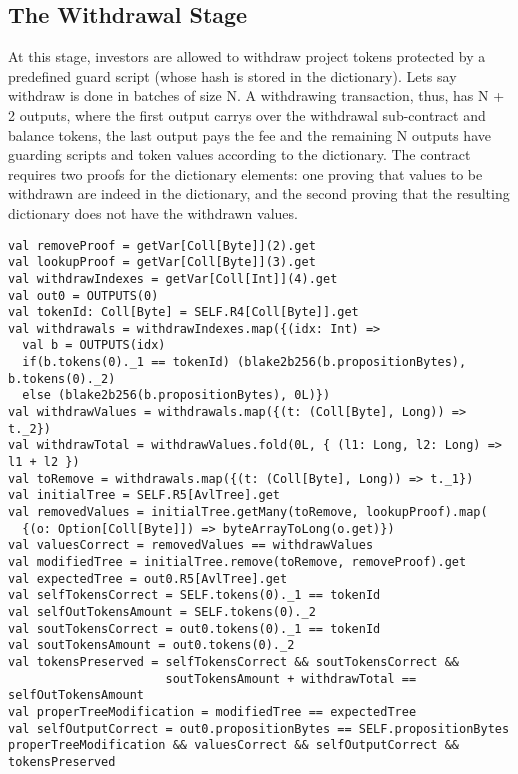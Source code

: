 \documentclass[11pt]{article}
\begin{document}
\subsection{The Withdrawal Stage}

At this stage, investors are allowed to withdraw project tokens protected by a predefined guard script (whose hash is stored in the dictionary). Lets say withdraw is done in batches of size N. A withdrawing transaction, thus, has N + 2 outputs, where the first output carrys over the withdrawal sub-contract and balance tokens, the last output pays the fee and the remaining N outputs have guarding scripts and token values according to the dictionary. The contract requires two proofs for the dictionary elements: one proving that values to be withdrawn are indeed in the dictionary, and the second proving that the resulting dictionary does not have the withdrawn values. 

\begin{verbatim}
val removeProof = getVar[Coll[Byte]](2).get
val lookupProof = getVar[Coll[Byte]](3).get
val withdrawIndexes = getVar[Coll[Int]](4).get
val out0 = OUTPUTS(0)
val tokenId: Coll[Byte] = SELF.R4[Coll[Byte]].get
val withdrawals = withdrawIndexes.map({(idx: Int) =>
  val b = OUTPUTS(idx)
  if(b.tokens(0)._1 == tokenId) (blake2b256(b.propositionBytes), b.tokens(0)._2)
  else (blake2b256(b.propositionBytes), 0L)})
val withdrawValues = withdrawals.map({(t: (Coll[Byte], Long)) => t._2})
val withdrawTotal = withdrawValues.fold(0L, { (l1: Long, l2: Long) => l1 + l2 })
val toRemove = withdrawals.map({(t: (Coll[Byte], Long)) => t._1})
val initialTree = SELF.R5[AvlTree].get
val removedValues = initialTree.getMany(toRemove, lookupProof).map(
  {(o: Option[Coll[Byte]]) => byteArrayToLong(o.get)})
val valuesCorrect = removedValues == withdrawValues
val modifiedTree = initialTree.remove(toRemove, removeProof).get
val expectedTree = out0.R5[AvlTree].get
val selfTokensCorrect = SELF.tokens(0)._1 == tokenId
val selfOutTokensAmount = SELF.tokens(0)._2
val soutTokensCorrect = out0.tokens(0)._1 == tokenId
val soutTokensAmount = out0.tokens(0)._2
val tokensPreserved = selfTokensCorrect && soutTokensCorrect && 
                      soutTokensAmount + withdrawTotal == selfOutTokensAmount
val properTreeModification = modifiedTree == expectedTree
val selfOutputCorrect = out0.propositionBytes == SELF.propositionBytes
properTreeModification && valuesCorrect && selfOutputCorrect && tokensPreserved
\end{verbatim}
\end{document}

